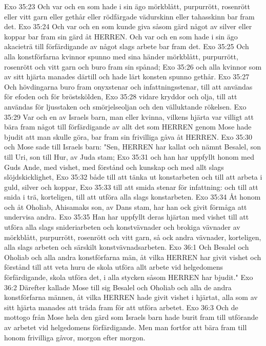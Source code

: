 Exo 35:23  Och var och en som hade i sin ägo mörkblått, purpurrött, rosenrött eller vitt garn eller gethår eller rödfärgade vädurskinn eller tahasskinn bar fram det.
Exo 35:24  Och var och en som kunde giva såsom gärd något av silver eller koppar bar fram sin gärd åt HERREN. Och var och en som hade i sin ägo akacieträ till förfärdigande av något slags arbete bar fram det.
Exo 35:25  Och alla konstförfarna kvinnor spunno med sina händer mörkblått, purpurrött, rosenrött och vitt garn och buro fram sin spånad;
Exo 35:26  och alla kvinnor som av sitt hjärta manades därtill och hade lärt konsten spunno gethår.
Exo 35:27  Och hövdingarna buro fram onyxstenar och infattningsstenar, till att användas för efoden och för bröstskölden,
Exo 35:28  vidare kryddor och olja, till att användas för ljusstaken och smörjelseoljan och den välluktande rökelsen.
Exo 35:29  Var och en av Israels barn, man eller kvinna, vilkens hjärta var villigt att bära fram något till förfärdigande av allt det som HERREN genom Mose hade bjudit att man skulle göra, bar fram sin frivilliga gåva åt HERREN.
Exo 35:30  och Mose sade till Israels barn: "Sen, HERREN har kallat och nämnt Besalel, son till Uri, son till Hur, av Juda stam;
Exo 35:31  och han har uppfyllt honom med Guds Ande, med vishet, med förstånd och kunskap och med allt slags slöjdskicklighet,
Exo 35:32  både till att tänka ut konstarbeten och till att arbeta i guld, silver och koppar,
Exo 35:33  till att smida stenar för infattning: och till att snida i trä, korteligen, till att utföra alla slags konstarbeten.
Exo 35:34  Åt honom och åt Oholiab, Ahisamaks son, av Dans stam, har han ock givit förmåga att undervisa andra.
Exo 35:35  Han har uppfyllt deras hjärtan med vishet till att utföra alla slags snideriarbeten och konstvävnader och brokiga vävnader av mörkblått, purpurrött, rosenrött och vitt garn, så ock andra vävnader, korteligen, alla slags arbeten och särskilt konstvävnadsarbeten.
Exo 36:1  Och Besalel och Oholiab och alla andra konstförfarna män, åt vilka HERREN har givit vishet och förstånd till att veta huru de skola utföra allt arbete vid helgedomens förfärdigande, skola utföra det, i alla stycken såsom HERREN har bjudit."
Exo 36:2  Därefter kallade Mose till sig Besalel och Oholiab och alla de andra konstförfarna männen, åt vilka HERREN hade givit vishet i hjärtat, alla som av sitt hjärta manades att träda fram för att utföra arbetet.
Exo 36:3  Och de mottogo från Mose hela den gärd som Israels barn hade burit fram till utförande av arbetet vid helgedomens förfärdigande. Men man fortfor att bära fram till honom frivilliga gåvor, morgon efter morgon.
